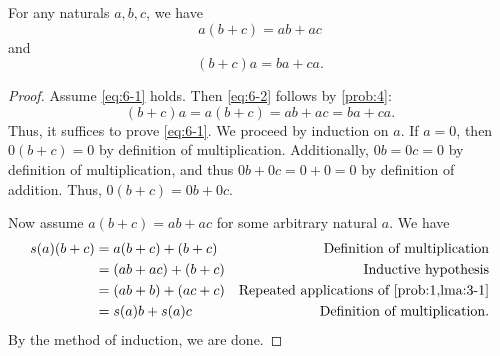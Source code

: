 \documentclass[11pt, letterpaper]{article}
\begin{document}
\begin{problem}
	For any naturals $a,b,c$, we have
	\begin{equation}\label{eq:6-1}
		a(b+c)=ab+ac
	\end{equation}
	and
	\begin{equation}\label{eq:6-2}
		(b+c)a=ba+ca.
	\end{equation}
\end{problem}
\begin{proof}
	Assume \eqref{eq:6-1} holds. Then \eqref{eq:6-2} follows by \cref{prob:4}:
	\[
		(b+c)a=a(b+c)=ab+ac=ba+ca
	.\]
	Thus, it suffices to prove \eqref{eq:6-1}. We proceed by induction on $a$. If $a=0$, then $0(b+c)=0$ by definition of multiplication. Additionally, $0b=0c=0$ by definition of multiplication, and thus $0b+0c=0+0=0$ by definition of addition. Thus, $0(b+c)=0b+0c$.

	Now assume $a(b+c)=ab+ac$ for some arbitrary natural $a$. We have
	\begin{align*}
		s(a)(b+c)&=a(b+c)+(b+c)&\text{Definition of multiplication}\\
			 &=(ab+ac)+(b+c)&\text{Inductive hypothesis} \\
			 &=(ab+b)+(ac+c)&\text{Repeated applications of \cref{prob:1,lma:3-1}}\\
			 &=s(a)b+s(a)c&\text{Definition of multiplication}
	.\end{align*}
	By the method of induction, we are done.
\end{proof}







\end{document}
